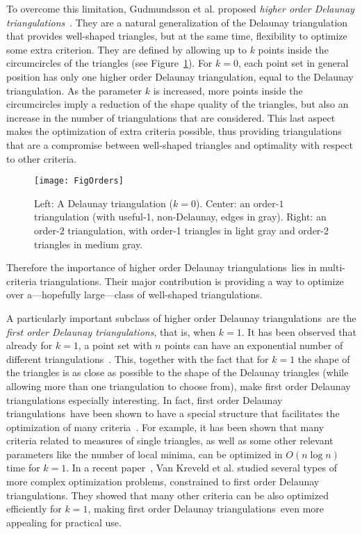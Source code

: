 \documentclass {journal}
\newcommand {\hodts}{higher order Delaunay triangulations}
\newcommand {\fodts}{first order Delaunay triangulations}
\begin{document}
To overcome this limitation, Gudmundsson et al. proposed
\emph{\hodts}~\cite{ghk-hodt-02}. They are a natural
generalization of the Delaunay triangulation that provides
well-shaped triangles, but at the same time,  flexibility to
optimize some extra criterion. They are defined by allowing up to
$k$ points inside the circumcircles of the triangles (see Figure~\ref{fig:FigOrders}). For $k=0$,
each point set in general position has only one higher order
Delaunay triangulation, equal to the Delaunay triangulation. As
the parameter $k$ is increased, more points inside the
circumcircles imply a reduction of the shape quality of the
triangles, but also an increase in the number of triangulations
that are considered. This last aspect makes the optimization of
extra criteria possible, thus providing triangulations that are a
compromise between well-shaped triangles and optimality with
respect to other criteria.



   \begin{figure}[tb]
\centering
\texttt{[image: FigOrders]}
\caption{Left: A Delaunay triangulation ($k=0$). Center: an
order-$1$ triangulation (with useful-1, non-Delaunay, edges in
gray). Right: an order-$2$ triangulation, with order-1 triangles
in light gray and order-2 triangles in medium gray.}
\label{fig:FigOrders}
\end{figure}


Therefore the importance of \hodts\ lies in multi-criteria
triangulations. Their major contribution is providing a way to
optimize over a---hopefully large---class of well-shaped
triangulations.

A particularly important subclass of \hodts\ are the
\emph{\fodts}, that is, when $k=1$. It has been observed that
already for $k=1$, a point set with $n$ points can have an
exponential number of different triangulations~\cite{s-opt-09}.
This, together with the fact that for $k=1$ the shape of the
triangles is as close as possible to the shape of the Delaunay
triangles (while allowing more than one triangulation to choose
from), make first order Delaunay triangulations especially
interesting. In fact, \fodts\ have been shown to have a special
structure that facilitates the optimization of many
criteria~\cite{ghk-hodt-02}. For example, it has been shown that
many criteria related to measures of single triangles, as well as
some other relevant parameters like the number of local minima,
can be optimized in $O(n \log n)$ time for $k=1$. In a recent
paper~\cite{kls-ofodt-09}, Van Kreveld et al. studied several
types of more complex optimization problems, constrained to
\fodts. They showed that many other criteria can be also optimized
efficiently for $k=1$, making \fodts\ even more appealing for
practical use.
\end{document}
